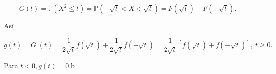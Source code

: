 \documentclass[a4paper,9pt]{report}
\begin{document}
\begin{enumerate}
\begin{enumerate}
\[
G(t) = \mathbb{P}(X^2 \leq t) = \mathbb{P}(-\sqrt{t} < X < \sqrt{t} ) = F(\sqrt{t}) - F(-\sqrt{t}).
\]

As\'i

\[
g(t) = G^{'}(t) = \frac{1}{2\sqrt{t}}f(\sqrt{t}) + \frac{1}{2\sqrt{t}}f(-\sqrt{t}) = \frac{1}{2\sqrt{t}}[f(\sqrt{t}) + f(-\sqrt{t})],\ t\geq 0.
\]

Para $t < 0, g(t) = 0$.b

\end{enumerate}
\end{enumerate}
\end{document}

